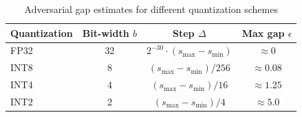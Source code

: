 \begin{table}[t]






\caption{Adversarial gap estimates for different quantization schemes}






\label{tab:adv-gap}






\begin{center}






\begin{tabular}{lccc}






\toprule






Quantization & Bit-width $b$ & Step $\Delta$ & Max gap $\epsilon$ \\






\midrule






FP32 & 32 & $2^{-30} \cdot (s_{\max} - s_{\min})$ & $\approx 0$ \\






INT8 & 8 & $ (s_{\max} - s_{\min}) / 256$ & $\approx 0.08$ \\






INT4 & 4 & $ (s_{\max} - s_{\min}) / 16$  & $\approx 1.25$ \\






INT2 & 2 & $ (s_{\max} - s_{\min}) / 4$   & $\approx 5.0$ \\






\bottomrule






\end{tabular}






\end{center}






\end{table}













